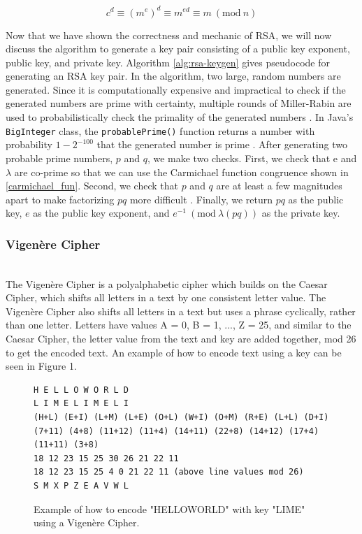 \documentclass[acmlarge]{acmart}
\newcommand{\Mod}[1]{\ (\mathrm{mod}\ #1)}
\begin{document}
\begin{equation}
	c^{d} \equiv (m^{e})^{d} \equiv m^{ed} \equiv m \Mod{n}
\end{equation}

Now that we have shown the correctness and mechanic of RSA, we will now discuss the algorithm to generate a key pair consisting of a public key exponent, public key, and private key. Algorithm \ref{alg:rsa-keygen} gives pseudocode for generating an RSA key pair. In the algorithm, two large, random numbers are generated. Since it is computationally expensive and impractical to check if the generated numbers are prime with certainty, multiple rounds of Miller-Rabin are used to probabilistically check the primality of the generated numbers \cite{MillerRabin}. In Java's \texttt{BigInteger} class, the \texttt{probablePrime()} function returns a number with probability $1 - 2^{-100}$ that the generated number is prime \cite{BigIntegerDoc}. After generating two probable prime numbers, $p$ and $q$, we make two checks. First, we check that e and $\lambda$ are co-prime so that we can use the Carmichael function congruence shown in \ref{carmichael_fun}. Second, we check that $p$ and $q$ are at least a few magnitudes apart to make factorizing $pq$ more difficult \cite{RSA}. Finally, we return $pq$ as the public key, $e$ as the public key exponent, and $e^{-1} \Mod{\lambda(pq)}$ as the private key.

\subsubsection{Vigen\`{e}re Cipher}
\hspace*{\fill} \\ %
The Vigen\`{e}re Cipher is a polyalphabetic cipher which builds on the Caesar Cipher, which shifts all letters in a text by one consistent letter value. The Vigen\`{e}re Cipher also shifts all letters in a text but uses a phrase cyclically, rather than one letter. Letters have values A = 0, B = 1, ..., Z = 25, and similar to the Caesar Cipher, the letter value from the text and key are added together, mod 26 to get the encoded text. An example of how to encode text using a key can be seen in Figure 1.

\begin{figure}
\centering
\begin{BVerbatim}
H E L L O W O R L D
L I M E L I M E L I
(H+L) (E+I) (L+M) (L+E) (O+L) (W+I) (O+M) (R+E) (L+L) (D+I)
(7+11) (4+8) (11+12) (11+4) (14+11) (22+8) (14+12) (17+4) (11+11) (3+8)
18 12 23 15 25 30 26 21 22 11
18 12 23 15 25 4 0 21 22 11 (above line values mod 26)
S M X P Z E A V W L
\end{BVerbatim}
\caption{Example of how to encode "HELLOWORLD" with key "LIME" using a Vigen\`{e}re Cipher.}
\label{fig:despython}
\end{figure}
\end{document}
